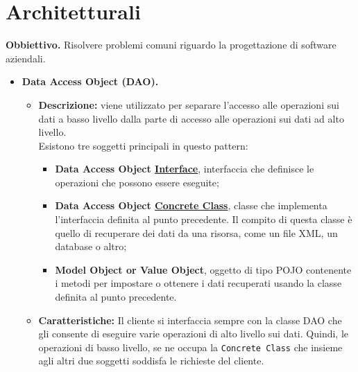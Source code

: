 \documentclass[a4paper,11pt]{article}
\begin{document}
\newpage

\section{Architetturali}
\textcolor{Mahogany}{\textbf{Obbiettivo.}} Risolvere problemi comuni riguardo la progettazione di software aziendali.
\begin{itemize}
	\item[\ding{42}] \textbf{Data Access Object (DAO).}
	\begin{itemize}
		\item \textbf{Descrizione:} viene utilizzato per separare l'accesso alle operazioni sui dati a basso livello dalla parte di accesso alle operazioni sui dati ad alto livello.\\
		Esistono tre soggetti principali in questo pattern:
		\begin{itemize}
			\item[\ding{80}] \textbf{Data Access Object \underline{Interface}}, interfaccia che definisce le operazioni che possono essere eseguite;
			\item[\ding{80}] \textbf{Data Access Object \underline{Concrete Class}}, classe che implementa l'interfaccia definita al punto precedente. Il compito di questa classe è quello di recuperare dei dati da una risorsa, come un file XML, un database o altro;
			\item[\ding{80}] \textbf{Model Object or Value Object}, oggetto di tipo POJO contenente i metodi per impostare o ottenere i dati recuperati usando la classe definita al punto precedente.
		\end{itemize}
		\item \textbf{Caratteristiche:} Il cliente si interfaccia sempre con la classe DAO che gli consente di eseguire varie operazioni di alto livello sui dati. Quindi, le operazioni di basso livello, se ne occupa la \texttt{Concrete Class} che insieme agli altri due soggetti soddisfa le richieste del cliente.
	\end{itemize}
\end{itemize}
\end{document}
